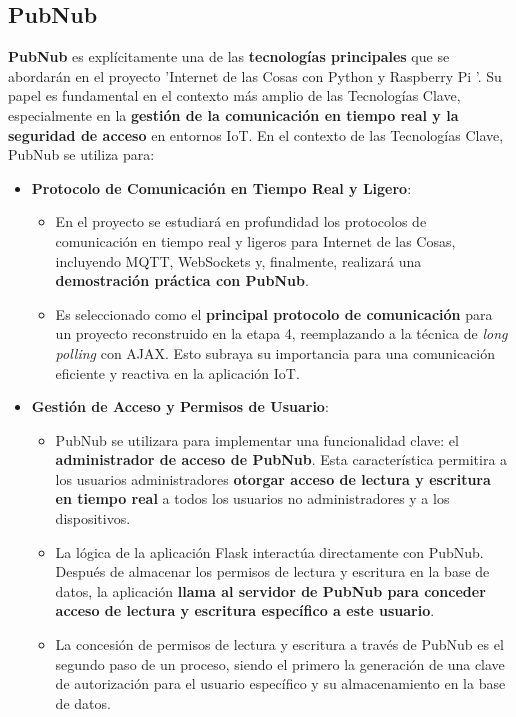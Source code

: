 \documentclass{report}
\begin{document}
\subsection{PubNub}
\textbf{PubNub} \cite{pubnub} es explícitamente una de las \textbf{tecnologías principales} que se abordarán en el 
proyecto  'Internet de las Cosas con Python y Raspberry Pi '. Su papel es fundamental en el contexto más amplio de las Tecnologías 
Clave, especialmente en la \textbf{gestión de la comunicación en tiempo real y la seguridad de acceso} en entornos IoT. En el contexto 
de las Tecnologías Clave, PubNub se utiliza para:
\begin{itemize}
    \item \textbf{Protocolo de Comunicación en Tiempo Real y Ligero}:
    \begin{itemize}
        \item En el proyecto se estudiará en profundidad los protocolos de comunicación en tiempo real y ligeros para Internet de las Cosas, 
        incluyendo MQTT, WebSockets y, finalmente, realizará una \textbf{demostración práctica con PubNub}.
        \item Es seleccionado como el \textbf{principal protocolo de comunicación} para un proyecto reconstruido en la etapa 4, reemplazando 
        a la técnica de \textit{long polling} con AJAX. Esto subraya su importancia para una comunicación eficiente y reactiva en la 
        aplicación IoT.
    \end{itemize}

    \item \textbf{Gestión de Acceso y Permisos de Usuario}:
    \begin{itemize}
        \item PubNub se utilizara para implementar una funcionalidad clave: el \textbf{administrador de acceso de PubNub}. Esta característica 
        permitira a los usuarios administradores \textbf{otorgar acceso de lectura y escritura en tiempo real} a todos los usuarios no 
        administradores y a los dispositivos.
        \item La lógica de la aplicación Flask interactúa directamente con PubNub. Después de almacenar los permisos de lectura y escritura en 
        la base de datos, la aplicación \textbf{llama al servidor de PubNub para conceder acceso de lectura y escritura específico a este 
        usuario}.
        \item La concesión de permisos de lectura y escritura a través de PubNub es el segundo paso de un proceso, siendo el primero la 
        generación de una clave de autorización para el usuario específico y su almacenamiento en la base de datos.
    \end{itemize}


\end{itemize}
\end{document}
